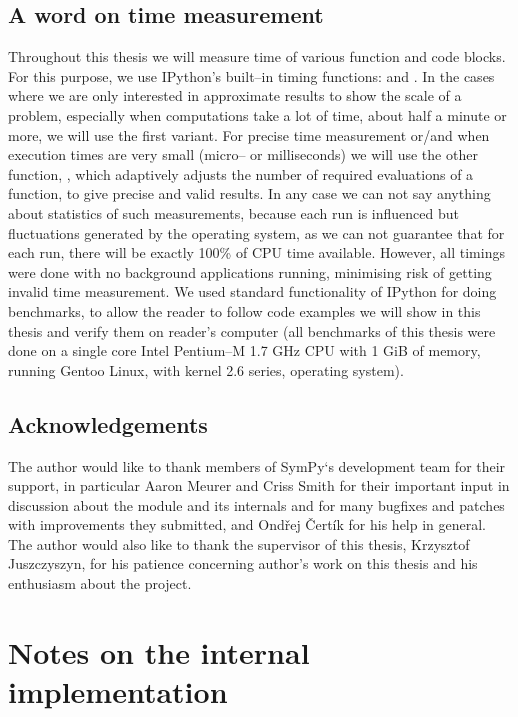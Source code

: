 \section{A word on time measurement}

Throughout this thesis we will measure time of various function and code blocks. For this purpose,
we use IPython's built--in timing functions:  and . In the cases where we are
only interested in approximate results to show the scale of a problem, especially when computations
take a lot of time, about half a minute or more, we will use the first variant. For precise time
measurement or/and when execution times are very small (micro-- or milliseconds) we will use the
other function,  , which adaptively adjusts the number of required evaluations of a
function, to give precise and valid results. In any case we can not say anything about statistics
of such measurements, because each run is influenced but fluctuations generated by the operating
system, as we can not guarantee that for each run, there will be exactly 100\% of CPU time available.
However, all timings were done with no background applications running, minimising risk of getting
invalid time measurement. We used standard functionality of IPython for doing benchmarks, to allow
the reader to follow code examples we will show in this thesis and verify them on reader's computer
(all benchmarks of this thesis were done on a single core Intel Pentium--M 1.7 GHz CPU with 1 GiB
of memory, running Gentoo Linux, with kernel 2.6 series, operating system).


\section{Acknowledgements}

The author would like to thank members of SymPy`s development team for their support, in particular
Aaron Meurer and Criss Smith for their important input in discussion about the module and its internals
and for many bugfixes and patches with improvements they submitted, and Ondřej Čertík for his help in
general. The author would also like to thank the supervisor of this thesis, Krzysztof Juszczyszyn, for
his patience concerning author's work on this thesis and his enthusiasm about the project.



\chapter{Notes on the internal implementation}\label{thesis-internals}

